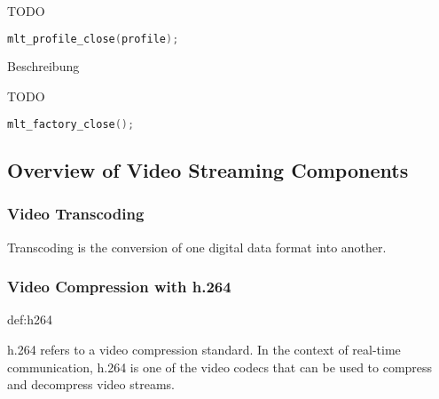 \documentclass[../MasterThesis.tex]{subfiles}
\begin{document}
\begin{description}[font=\normalfont\color{RedViolet!80!black}, style=nextline]
	TODO
	
	\begin{lstlisting}[language=C, numbers=none, basicstyle=\scriptsize\ttfamily]
	mlt_profile_close(profile); \end{lstlisting}
	
	
	
	\item[Close the factory] Beschreibung
	
	TODO
	
	\begin{lstlisting}[language=C, numbers=none, basicstyle=\scriptsize\ttfamily]
	mlt_factory_close();
	\end{lstlisting}
	
	
\end{description}












\subsection{Overview of Video Streaming Components}

\subsubsection*{Video Transcoding} 

Transcoding is the conversion of one digital data format into another.~\cite{transcoding}







\subsubsection*{Video Compression with h.264} 

\begin{CountingDefinition}[h.264]{def:h264}
	
h.264 refers to a video compression standard. In the context of real-time communication, h.264 is one of the video codecs that can be used to compress and decompress video streams.
	
\end{CountingDefinition}
\end{document}
